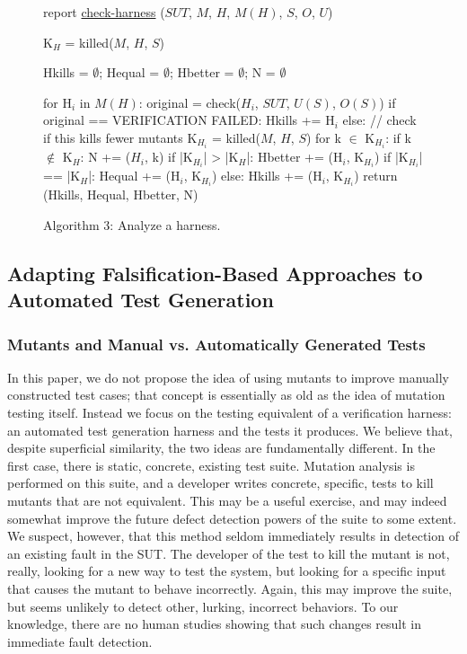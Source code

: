 \documentclass{svjour3}
\begin{document}
\begin{figure}
{%
\begin{code}
report {\underline{check-harness}} ($SUT$, $M$, $H$, $M(H)$, $S$, $O$, $U$) 
\vspace{0.1in}

  K$_H$ = killed($M$, $H$, $S$) 

  Hkills = $\emptyset$; Hequal = $\emptyset$; Hbetter = $\emptyset$; N = $\emptyset$

  for H$_i$ in $M(H)$:
     original = check($H_i$, $SUT$, $U(S)$, $O(S)$)
     if original == VERIFICATION FAILED: 
        Hkills += H$_i$
     else: // check if this kills fewer mutants
        K$_{H_i}$ = killed($M$, $H$, $S$)
        for k $\in$ K$_{H_i}$:
           if k $\not\in$ K$_H$: N += ($H_i$, k)
        if |K$_{H_i}$| > |K$_H$|:
           Hbetter += (H$_i$, K$_{H_i}$)
        if |K$_{H_i}$| == |K$_H$|:
           Hequal += (H$_i$, K$_{H_i}$)
        else:
           Hkills += (H$_i$, K$_{H_i}$)
  return (Hkills, Hequal, Hbetter, N)
\end{code}
}
\caption{Algorithm 3: Analyze a harness.}
\label{alg:checkharness}
\end{figure}


\subsection{Adapting Falsification-Based Approaches to Automated Test
  Generation}

\subsubsection{Mutants and Manual vs. Automatically Generated Tests}

In this paper, we do not propose the idea of using mutants to improve
manually constructed test cases; that concept is essentially as old as
the idea of mutation testing itself.  Instead we focus on the testing
equivalent of a verification harness: an automated test generation
harness and the tests it produces.  We believe that, despite
superficial similarity, the two ideas are fundamentally different.  In
the first case, there is static, concrete, existing test suite.
Mutation analysis is performed on this suite, and a developer writes
concrete, specific, tests to kill mutants that are not equivalent.
This may be a useful exercise, and may indeed somewhat improve the
future defect detection powers of the suite
\cite{justmutants,ahmed_testedness} to some extent.  We suspect,
however, that this method seldom immediately results in detection of
an existing fault in the SUT.  The developer of the test to kill the
mutant is not, really, looking for a new way to test the system, but
looking for a specific input that causes the mutant to behave
incorrectly.  Again, this may improve the suite, but seems unlikely to
detect other, lurking, incorrect behaviors.  To our knowledge, there
are no human studies showing that such changes result in immediate
fault detection.
\end{document}
